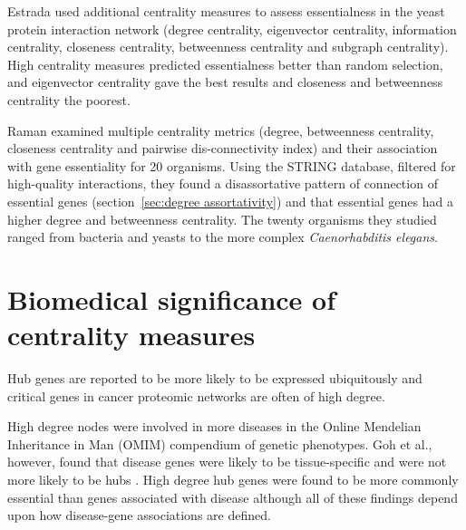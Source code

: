 Estrada\cite{estrada2006virtual} used additional centrality measures to assess essentialness in the yeast protein interaction network (degree centrality, eigenvector centrality, information centrality, closeness centrality, betweenness centrality and subgraph centrality).  High centrality measures predicted essentialness better than random selection, and eigenvector centrality gave the best results and closeness and betweenness centrality the poorest.

Raman \cite{raman2014organisational} examined multiple centrality metrics (degree, betweenness centrality, closeness centrality and pairwise dis-connectivity index) and their association with gene essentiality for 20 organisms. Using the STRING database, filtered for high-quality interactions, they found a disassortative pattern of connection of essential genes  (section~\ref{sec:degree assortativity})  and that essential genes had a higher degree and betweenness centrality. The twenty organisms they studied ranged from bacteria and yeasts to the more complex \textit{Caenorhabditis elegans}.


\section{Biomedical significance of centrality measures}
 \label{sec:biomedical significance of centrality measures}
\label{sec:biomedical review centrality}
Hub genes are reported to be more likely to be expressed ubiquitously\cite{goh2007human} and critical genes in cancer proteomic networks are often of high degree\cite{wachi2005interactome}. 

 High degree nodes were involved in more diseases in the Online Mendelian Inheritance in Man (OMIM) compendium of genetic phenotypes\cite{xu2006discovering}. Goh et al., however, found that disease genes were likely to be tissue-specific and were not more likely to be hubs \cite{goh2007human}.  High degree hub genes were found to be more commonly essential than genes associated with disease\cite{barabasi2011network} although all of these findings depend upon how disease-gene associations are defined. 

